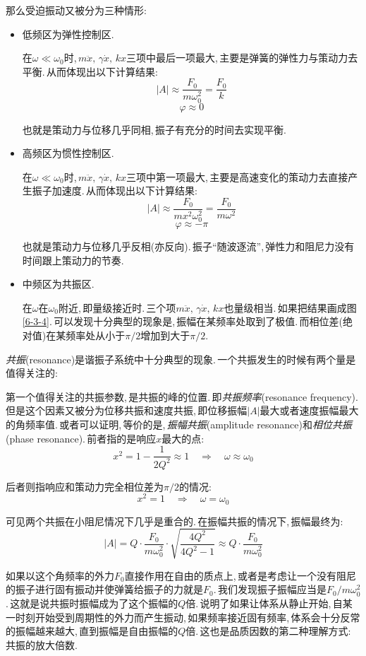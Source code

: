 那么受迫振动又被分为三种情形:

\begin{itemize}
	\item 低频区为弹性控制区.

	在$\omega\ll\omega_0$时,\,$m\ddot{x},\,\gamma\dot{x},\,kx$三项中最后一项最大,\,主要是弹簧的弹性力与策动力去平衡.\,从而体现出以下计算结果:
	\[|A|\approx \frac{F_0}{m\omega_0^2}=\frac{F_0}{k}\]
	\[\varphi\approx 0\]

	也就是策动力与位移几乎同相,\,振子有充分的时间去实现平衡.

	\item 高频区为惯性控制区.

	在$\omega\ll\omega_0$时,\,$m\ddot{x},\,\gamma\dot{x},\,kx$三项中第一项最大,\,主要是高速变化的策动力去直接产生振子加速度.\,从而体现出以下计算结果:
	\[|A|\approx \frac{F_0}{mx^2\omega_0^2}=\frac{F_0}{m\omega^2}\]
	\[\varphi\approx -\pi\]

	也就是策动力与位移几乎反相(亦反向).\,振子``随波逐流'',\,弹性力和阻尼力没有时间跟上策动力的节奏.

	\item 中频区为共振区.

	在$\omega$在$\omega_0$附近,\,即量级接近时.\,三个项$m\ddot{x},\,\gamma\dot{x},\,kx$也量级相当.\,如果把结果画成图\ref{6-3-4}.\,可以发现十分典型的现象是,\,振幅在某频率处取到了极值.\,而相位差(绝对值)在某频率处从小于$\pi/2$增加到大于$\pi/2$.
\end{itemize}

\emph{共振}(resonance)是谐振子系统中十分典型的现象.\,一个共振发生的时候有两个量是值得关注的:

第一个值得关注的共振参数,\,是共振的峰的位置.\,即\emph{共振频率}(resonance frequency).\,但是这个因素又被分为位移共振和速度共振,\,即位移振幅$|A|$最大或者速度振幅最大的角频率值.\,或者可以证明,\,等价的是,\,\emph{振幅共振}(amplitude resonance)和\emph{相位共振}(phase resonance).\,前者指的是响应$x$最大的点:
\[x^2=1-\frac{1}{2Q^2}\approx 1\quad \Rightarrow \quad \omega\approx\omega_0\]

后者则指响应和策动力完全相位差为$\pi/2$的情况:
\[x^2=1\quad \Rightarrow \quad \omega=\omega_0\]

可见两个共振在小阻尼情况下几乎是重合的.\,在振幅共振的情况下,\,振幅最终为:
\[|A|=Q\cdot\frac{F_0}{m\omega_0^2}\cdot\sqrt{\frac{4Q^2}{4Q^2-1}}\approx Q\cdot\frac{F_0}{m\omega_0^2}\]

如果以这个角频率的外力$F_0$直接作用在自由的质点上,\,或者是考虑让一个没有阻尼的振子进行固有振动并使弹簧给振子的力就是$F_0$.\,我们发现振子振幅应当是$F_0/m\omega_0^2$.\,这就是说共振时振幅成为了这个振幅的$Q$倍.\,说明了如果让体系从静止开始,\,自某一时刻开始受到周期性的外力而产生振动,\,如果频率接近固有频率,\,体系会十分反常的振幅越来越大,\,直到振幅是自由振幅的$Q$倍.\,这也是品质因数的第二种理解方式:\,共振的放大倍数.

